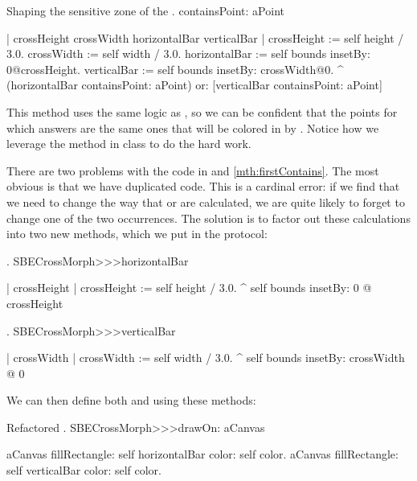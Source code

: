 \documentclass[a4paper,10pt,twoside]{book}
\begin{document}

\begin{method}[firstContains]{Shaping the sensitive zone of the .}
containsPoint: aPoint

	| crossHeight crossWidth horizontalBar verticalBar |
	crossHeight := self height / 3.0.
	crossWidth := self width / 3.0.
	horizontalBar := self bounds insetBy: 0@crossHeight.
	verticalBar := self bounds insetBy: crossWidth@0.
	^ (horizontalBar containsPoint: aPoint)
		or: [verticalBar containsPoint: aPoint]
\end{method}

This method uses the same logic as , so we can be confident that the points for which  answers  are the same ones that will be colored in by .
Notice how we leverage the  method in class  to do the hard work.

There are two problems with the code in  and \ref{mth:firstContains}.
The most obvious is that we have duplicated code.
This is a cardinal error: if we find that we need to change the way that  or  are calculated, we are quite likely to forget to change one of the two occurrences.
The solution is to factor out these calculations into two new methods, which we put in the  protocol:

\begin{method}{.}
SBECrossMorph>>>horizontalBar

	| crossHeight |
	crossHeight := self height / 3.0.
	^ self bounds insetBy: 0 @ crossHeight
\end{method}

\begin{method}{.}
SBECrossMorph>>>verticalBar

	| crossWidth |
	crossWidth := self width / 3.0.
	^ self bounds insetBy: crossWidth @ 0
\end{method}

\noindent
We can then define both  and  using these methods:

\begin{method}{Refactored .}
SBECrossMorph>>>drawOn: aCanvas

	aCanvas fillRectangle: self horizontalBar color: self color.
	aCanvas fillRectangle: self verticalBar color: self color.
\end{method}
\end{document}
